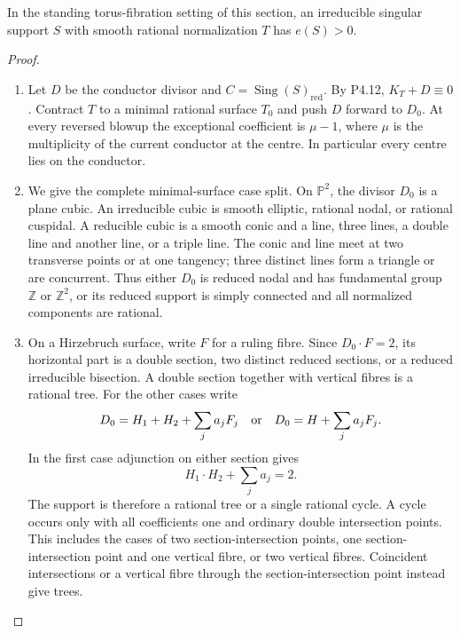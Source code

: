 \begin{proposition}[P4.21]\hypertarget{tag-02WT}{}\label{night:P4.21}\label{stmt:P4.21}

In the standing torus-fibration setting of this section, an irreducible singular support $S$
with smooth rational normalization $T$ has $e(S)>0$.
\end{proposition}
\begin{proof}

\begin{enumerate}[label={$\langle1\rangle$\arabic*.},leftmargin=*]
\item Let $D$ be the conductor divisor and
$C=\operatorname{Sing}(S)_{\mathrm{red}}$. By P4.12,
$K_T+D\equiv0$. Contract $T$ to a minimal rational surface
$T_0$ and push $D$ forward to $D_0$. At every reversed
blowup the exceptional coefficient is $\mu-1$, where
$\mu$ is the multiplicity of the current conductor at the
centre. In particular every centre lies on the conductor.

\item We give the complete minimal-surface case split. On
$\mathbb P^2$, the divisor $D_0$ is a plane cubic. An
irreducible cubic is smooth elliptic, rational nodal, or
rational cuspidal. A reducible cubic is a smooth conic
and a line, three lines, a double line and another line,
or a triple line. The conic and line meet at two
transverse points or at one tangency; three distinct
lines form a triangle or are concurrent. Thus either
$D_0$ is reduced nodal and has fundamental group
$\mathbb Z$ or $\mathbb Z^2$, or its reduced support is
simply connected and all normalized components are
rational.

\item On a Hirzebruch surface, write $F$ for a ruling fibre.
Since $D_0\cdot F=2$, its horizontal part is a double
section, two distinct reduced sections, or a reduced
irreducible bisection. A double section together with
vertical fibres is a rational tree. For the other cases
write
\[
 D_0=H_1+H_2+\sum_j a_jF_j
 \quad\hbox{or}\quad
 D_0=H+\sum_j a_jF_j.
\]
In the first case adjunction on either section gives
\[
 H_1\cdot H_2+\sum_j a_j=2.
\]
The support is therefore a rational tree or a single
rational cycle. A cycle occurs only with all coefficients
one and ordinary double intersection points. This
includes the cases of two section-intersection points,
one section-intersection point and one vertical fibre,
or two vertical fibres. Coincident intersections or a
vertical fibre through the section-intersection point
instead give trees.


\end{enumerate}
\end{proof}
